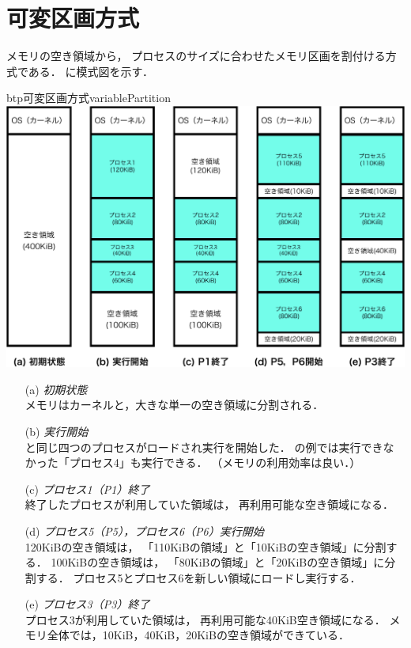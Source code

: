 \section{可変区画方式}
メモリの空き領域から，
プロセスのサイズに合わせたメモリ区画を割付ける方式である．
に模式図を示す．

\begin{myfig}{btp}{可変区画方式}{variablePartition}
  \includegraphics[scale=0.6]{Fig/variablePartition-crop.pdf}
\end{myfig}

\begin{enumerate}
\item[(a)] \emph{初期状態} \\
  メモリはカーネルと，大きな単一の空き領域に分割される．
\item[(b)] \emph{実行開始} \\
  と同じ四つのプロセスがロードされ実行を開始した．
  の例では実行できなかった「プロセス4」も実行できる．
         （メモリの利用効率は良い．）
\item[(c)] \emph{プロセス1（P1）終了} \\
  終了したプロセスが利用していた領域は，
  再利用可能な空き領域になる．
\item[(d)] \emph{プロセス5（P5），プロセス6（P6）実行開始} \\
  120KiBの空き領域は，
  「110KiBの領域」と「10KiBの空き領域」に分割する．
  100KiBの空き領域は，
  「80KiBの領域」と「20KiBの空き領域」に分割する．
  プロセス5とプロセス6を新しい領域にロードし実行する．
\item[(e)] \emph{プロセス3（P3）終了} \\
  プロセス3が利用していた領域は，
  再利用可能な40KiB空き領域になる．
  メモリ全体では，10KiB，40KiB，20KiBの空き領域ができている．
\end{enumerate}

